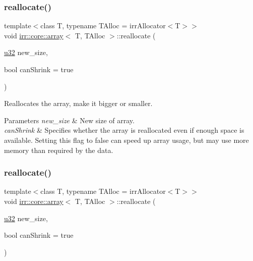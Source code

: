 \subsubsection{\texorpdfstring{reallocate()}{reallocate()}\hspace{0.1cm}{\footnotesize\ttfamily [1/2]}}
{\footnotesize\ttfamily template$<$class T, typename T\+Alloc = irr\+Allocator$<$\+T$>$$>$ \\
void \hyperlink{classirr_1_1core_1_1array}{irr\+::core\+::array}$<$ T, T\+Alloc $>$\+::reallocate (\begin{DoxyParamCaption}\item[{\hyperlink{namespaceirr_a0416a53257075833e7002efd0a18e804}{u32}}]{new\+\_\+size,  }\item[{bool}]{can\+Shrink = {\ttfamily true} }\end{DoxyParamCaption})\hspace{0.3cm}{\ttfamily [inline]}}



Reallocates the array, make it bigger or smaller. 


\begin{DoxyParams}{Parameters}
{\em new\+\_\+size} & New size of array. \\
\hline
{\em can\+Shrink} & Specifies whether the array is reallocated even if enough space is available. Setting this flag to false can speed up array usage, but may use more memory than required by the data. \\
\hline
\end{DoxyParams}
\mbox{\label{classirr_1_1core_1_1array_ada5735f409eca82b9031d993ee8b31c3}} 
\subsubsection{\texorpdfstring{reallocate()}{reallocate()}\hspace{0.1cm}{\footnotesize\ttfamily [2/2]}}
{\footnotesize\ttfamily template$<$class T, typename T\+Alloc = irr\+Allocator$<$\+T$>$$>$ \\
void \hyperlink{classirr_1_1core_1_1array}{irr\+::core\+::array}$<$ T, T\+Alloc $>$\+::reallocate (\begin{DoxyParamCaption}\item[{\hyperlink{namespaceirr_a0416a53257075833e7002efd0a18e804}{u32}}]{new\+\_\+size,  }\item[{bool}]{can\+Shrink = {\ttfamily true} }\end{DoxyParamCaption})\hspace{0.3cm}{\ttfamily [inline]}}



